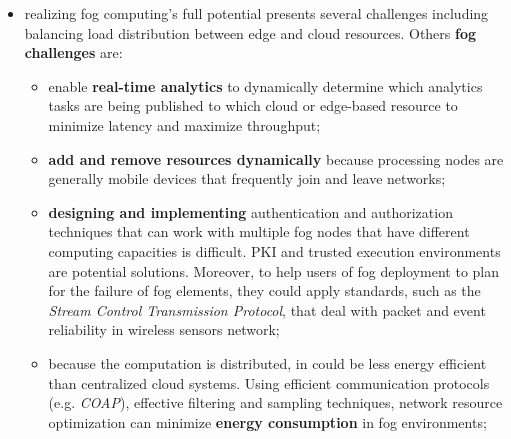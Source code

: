 \documentclass[oneside]{article}
\begin{document}
\begin{itemize}
    \item realizing fog computing's full potential presents several challenges including balancing load distribution between edge and cloud resources. Others \textbf{fog challenges} are:
    \begin{itemize}
        \item enable \textbf{real-time analytics} to dynamically determine which analytics tasks are being published to which cloud or edge-based resource to minimize latency and maximize throughput;
        \item \textbf{add and remove resources dynamically} because processing nodes are generally mobile devices that frequently join and leave networks;
        \item \textbf{designing and implementing} authentication and authorization techniques that can work with multiple fog nodes that have different computing capacities is difficult. PKI and trusted execution environments are potential solutions. Moreover, to help users of fog deployment to plan for the failure of fog elements, they could apply standards, such as the \textit{Stream Control Transmission Protocol}, that deal with packet and event reliability in wireless sensors network;
        \item because the computation is distributed, in could be less energy efficient than centralized cloud systems. Using efficient communication protocols (e.g. \textit{COAP}), effective filtering and sampling techniques, network resource optimization can minimize \textbf{energy consumption} in fog environments;
    \end{itemize}
\end{itemize}




\end{document}

